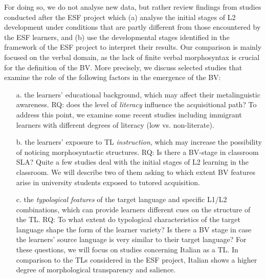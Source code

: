 \documentclass[output=paper]{langscibook}
\begin{document}
For doing so, we do not analyse new data, but rather review findings from studies conducted after the ESF project which (a) analyse the initial stages of L2 development under conditions that are partly different from those encountered by the ESF learners, and (b) use the developmental stages identified in the framework of the ESF project to interpret their results. Our comparison is mainly focused on the verbal domain, as the lack of finite verbal morphosyntax is crucial for the definition of the BV. More precisely, we discuss selected studies that examine the role of the following factors in the emergence of the BV:

\begin{itemize}
\item [a.]
the learners’ educational background, which may affect their metalinguistic awareness. RQ: does the level of \textit{literacy} influence the acquisitional path? To address this point, we examine some recent studies including immigrant learners with different degrees of literacy (low vs. non-literate).


\item [b.]   the learners’ exposure to TL \textit{instruction}, which may increase the possibility of noticing morphosyntactic structures. RQ: Is there a BV-stage in classroom SLA? Quite a few studies deal with the initial stages of L2 learning in the classroom. We will describe two of them asking to which extent BV features arise in university students exposed to tutored acquisition.

\item [c.]   the \textit{typological features} of the target language and specific L1\slash L2 combinations, which can provide learners different cues on the structure of the TL. RQ: To what extent do typological characteristics of the target language shape the form of the learner variety? Is there a BV stage in case the learners’ source language is very similar to their target language? For these questions, we will focus on studies concerning Italian as a TL. In comparison to the TLs considered in the ESF project, Italian shows a higher degree of morphological transparency and salience. 
\end{itemize}
\end{document}

